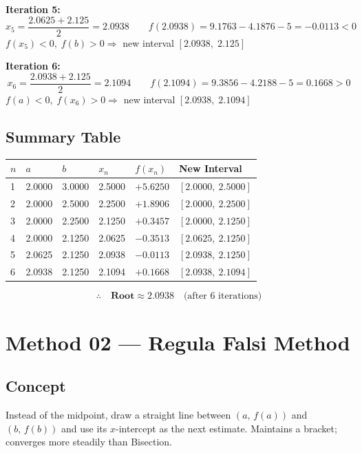 \documentclass[12pt]{article}
\newcommand{\hcell}[1]{\textbf{\color{white}#1}}
\begin{document}
\medskip
\noindent\textbf{Iteration 5:}
\[
  x_5 = \frac{2.0625+2.125}{2} = 2.0938
  \qquad
  f(2.0938) = 9.1763-4.1876-5 = -0.0113<0
\]
$f(x_5)<0,\;f(b)>0 \Rightarrow$ new interval $[2.0938,\;2.125]$

\medskip
\noindent\textbf{Iteration 6:}
\[
  x_6 = \frac{2.0938+2.125}{2} = 2.1094
  \qquad
  f(2.1094) = 9.3856-4.2188-5 = 0.1668>0
\]
$f(a)<0,\;f(x_6)>0 \Rightarrow$ new interval $[2.0938,\;2.1094]$

\subsection*{Summary Table}
\begin{center}
\begin{tabular}{C{0.8cm} C{1.8cm} C{1.8cm} C{1.8cm} C{2.2cm} C{3.5cm}}
\toprule
{}
\hcell{$n$} & \hcell{$a$} & \hcell{$b$} & \hcell{$x_n$} & \hcell{$f(x_n)$} & \hcell{New Interval} \\
\midrule
{}
1 & 2.0000 & 3.0000 & 2.5000 & $+5.6250$ & $[2.0000,\ 2.5000]$ \\
2 & 2.0000 & 2.5000 & 2.2500 & $+1.8906$ & $[2.0000,\ 2.2500]$ \\
3 & 2.0000 & 2.2500 & 2.1250 & $+0.3457$ & $[2.0000,\ 2.1250]$ \\
4 & 2.0000 & 2.1250 & 2.0625 & $-0.3513$ & $[2.0625,\ 2.1250]$ \\
5 & 2.0625 & 2.1250 & 2.0938 & $-0.0113$ & $[2.0938,\ 2.1250]$ \\
6 & 2.0938 & 2.1250 & 2.1094 & $+0.1668$ & $[2.0938,\ 2.1094]$ \\
\bottomrule
\end{tabular}
\end{center}
\[
  \therefore\quad \textbf{Root} \approx \mathbf{2.0938} \quad\text{(after 6 iterations)}
\]

\newpage

\section{Method 02 --- Regula Falsi Method}

\subsection*{Concept}
\begin{conceptbox}
Instead of the midpoint, draw a straight line between $(a,\,f(a))$ and $(b,\,f(b))$ and use its $x$-intercept as the next estimate. Maintains a bracket; converges more steadily than Bisection.
\end{conceptbox}
\end{document}
